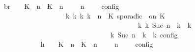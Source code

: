 \begin{isabellebody}
\ br{}{\isacharcolon}\ {\isacartoucheopen}{\isasymrho}\ {\isasymin}\ {\isasymlbrakk}\ {\isacharparenleft}{\isacharparenleft}K\ {\isasymUp}\ n{\isacharparenright}\ {\isacharhash}\ {\isacharparenleft}K\ {\isasymDown}\ n\ {\isacharat}\ {\isasymtau}{\isacharparenright}\ {\isacharhash}\ {\isasymGamma}{\isacharparenright}{\isacharcomma}\ n\ {\isasymturnstile}\ {\isasymPsi}\ {\isasymtriangleright}\ {\isasymPhi}\ {\isasymrbrakk}\isactrlsub c\isactrlsub o\isactrlsub n\isactrlsub f\isactrlsub i\isactrlsub g\isanewline
\ \ \ \ \ \ \ \ \ \ \ \ \ \ \ \ \ \ {\isasymLongrightarrow}\ {\isasymexists}{\isasymGamma}\isactrlsub k\ {\isasymPsi}\isactrlsub k\ {\isasymPhi}\isactrlsub k\ k{\isachardot}\ {\isacharparenleft}{\isacharparenleft}{\isasymGamma}{\isacharcomma}\ n\ {\isasymturnstile}\ {\isacharparenleft}{\isacharparenleft}K\ sporadic\ {\isasymtau}\ on\ K\ {\isacharhash}\ {\isasymPsi}{\isacharparenright}\ {\isasymtriangleright}\ {\isasymPhi}{\isacharparenright}\isanewline
\ \ \ \ \ \ \ \ \ \ \ \ \ \ \ \ \ \ \ \ \ \ \ \ \ \ \ \ \ \ \ \ \ \ \ \ \ \ \ \ {\isasymhookrightarrow}\isactrlbsup k\isactrlesup \ {\isacharparenleft}{\isasymGamma}\isactrlsub k{\isacharcomma}\ Suc\ n\ {\isasymturnstile}\ {\isasymPsi}\isactrlsub k\ {\isasymtriangleright}\ {\isasymPhi}\isactrlsub k{\isacharparenright}{\isacharparenright}\isanewline
\ \ \ \ \ \ \ \ \ \ \ \ \ \ \ \ \ \ \ \ \ \ \ \ \ \ \ \ {\isasymand}\ {\isasymrho}\ {\isasymin}\ {\isasymlbrakk}\ {\isasymGamma}\isactrlsub k{\isacharcomma}\ Suc\ n\ {\isasymturnstile}\ {\isasymPsi}\isactrlsub k\ {\isasymtriangleright}\ {\isasymPhi}\isactrlsub k\ {\isasymrbrakk}\isactrlsub c\isactrlsub o\isactrlsub n\isactrlsub f\isactrlsub i\isactrlsub g{\isacartoucheclose}\isanewline
\ \ \ \ \ \ \ \ \isamarkupfalse%
\ {\isacharminus}\isanewline
\ \ \ \ \ \ \ \ \ \ \isamarkupfalse%
\ h{}{\isacharcolon}\ {\isacartoucheopen}{\isasymrho}\ {\isasymin}\ {\isasymlbrakk}\ {\isacharparenleft}{\isacharparenleft}K\ {\isasymUp}\ n{\isacharparenright}\ {\isacharhash}\ {\isacharparenleft}K\ {\isasymDown}\ n\ {\isacharat}\ {\isasymtau}{\isacharparenright}\ {\isacharhash}\ {\isasymGamma}{\isacharparenright}{\isacharcomma}\ n\ {\isasymturnstile}\ {\isasymPsi}\ {\isasymtriangleright}\ {\isasymPhi}\ {\isasymrbrakk}\isactrlsub c\isactrlsub o\isactrlsub n\isactrlsub f\isactrlsub i\isactrlsub g{\isacartoucheclose}\isanewline
\ \ \ \ \ \ \ \ \ \ \isamarkupfalse%

\end{isabellebody}

